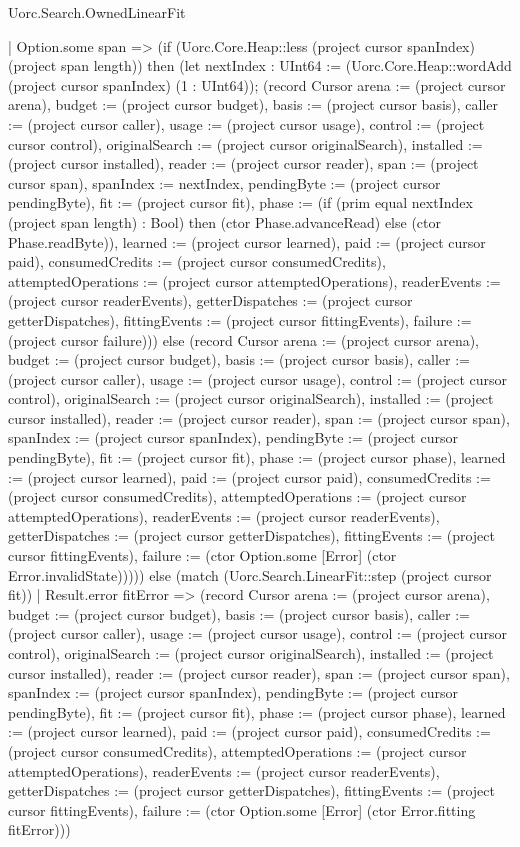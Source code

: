 \begin{lexlean}{Uorc.Search.OwnedLinearFit}
\begin{semanticmodule}
{    | Option.some span => (if (Uorc.Core.Heap::less (project cursor spanIndex) (project span length)) then (let nextIndex : UInt64 := (Uorc.Core.Heap::wordAdd (project cursor spanIndex) (1 : UInt64)); (record Cursor {arena := (project cursor arena), budget := (project cursor budget), basis := (project cursor basis), caller := (project cursor caller), usage := (project cursor usage), control := (project cursor control), originalSearch := (project cursor originalSearch), installed := (project cursor installed), reader := (project cursor reader), span := (project cursor span), spanIndex := nextIndex, pendingByte := (project cursor pendingByte), fit := (project cursor fit), phase := (if (prim equal nextIndex (project span length) : Bool) then (ctor Phase.advanceRead) else (ctor Phase.readByte)), learned := (project cursor learned), paid := (project cursor paid), consumedCredits := (project cursor consumedCredits), attemptedOperations := (project cursor attemptedOperations), readerEvents := (project cursor readerEvents), getterDispatches := (project cursor getterDispatches), fittingEvents := (project cursor fittingEvents), failure := (project cursor failure)})) else (record Cursor {arena := (project cursor arena), budget := (project cursor budget), basis := (project cursor basis), caller := (project cursor caller), usage := (project cursor usage), control := (project cursor control), originalSearch := (project cursor originalSearch), installed := (project cursor installed), reader := (project cursor reader), span := (project cursor span), spanIndex := (project cursor spanIndex), pendingByte := (project cursor pendingByte), fit := (project cursor fit), phase := (project cursor phase), learned := (project cursor learned), paid := (project cursor paid), consumedCredits := (project cursor consumedCredits), attemptedOperations := (project cursor attemptedOperations), readerEvents := (project cursor readerEvents), getterDispatches := (project cursor getterDispatches), fittingEvents := (project cursor fittingEvents), failure := (ctor Option.some [Error] (ctor Error.invalidState))}))) else (match (Uorc.Search.LinearFit::step (project cursor fit))
    | Result.error fitError => (record Cursor {arena := (project cursor arena), budget := (project cursor budget), basis := (project cursor basis), caller := (project cursor caller), usage := (project cursor usage), control := (project cursor control), originalSearch := (project cursor originalSearch), installed := (project cursor installed), reader := (project cursor reader), span := (project cursor span), spanIndex := (project cursor spanIndex), pendingByte := (project cursor pendingByte), fit := (project cursor fit), phase := (project cursor phase), learned := (project cursor learned), paid := (project cursor paid), consumedCredits := (project cursor consumedCredits), attemptedOperations := (project cursor attemptedOperations), readerEvents := (project cursor readerEvents), getterDispatches := (project cursor getterDispatches), fittingEvents := (project cursor fittingEvents), failure := (ctor Option.some [Error] (ctor Error.fitting fitError))})
}
\end{semanticmodule}
\end{lexlean}
